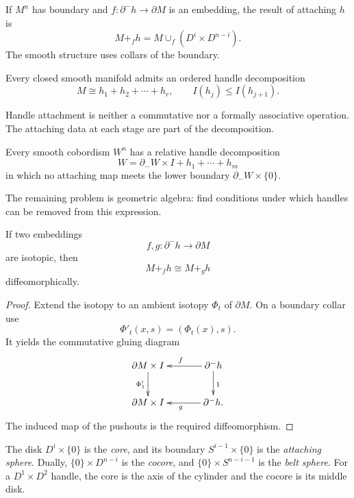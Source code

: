 If $M^n$ has boundary and
$f:\partial^-h\longrightarrow\partial M$ is
an embedding, the result of attaching $h$ is
$$
M+_fh=M\cup_f(D^i\times D^{n-i}).
$$
The smooth structure uses collars of the
boundary.

\begin{theorem}
\label{at-theorem-closed-handle-decomp}
Every closed smooth manifold admits an
ordered handle decomposition
$$
M\cong h_1+h_2+\cdots+h_r,
\qquad I(h_j)\leq I(h_{j+1}).
$$
\end{theorem}

\begin{remark}
\label{at-remark-handle-sum-order}
Handle attachment is neither a commutative
nor a formally associative operation.  The
attaching data at each stage are part of the
decomposition.
\end{remark}

\begin{theorem}
\label{at-theorem-relative-handles}
Every smooth cobordism $W^n$ has a relative
handle decomposition
$$
W=\partial_-W\times I+h_1+\cdots+h_m
$$
in which no attaching map meets the lower
boundary $\partial_-W\times\{0\}$.
\end{theorem}

The remaining problem is geometric algebra:
find conditions under which handles can be
removed from this expression.

\begin{lemma}
\label{at-lemma-isotopic-handle-attachments}
If two embeddings
$$
f,g:\partial^-h\longrightarrow\partial M
$$
are isotopic, then
$$
M+_fh\cong M+_gh
$$
diffeomorphically.
\end{lemma}

\begin{proof}
Extend the isotopy to an ambient isotopy
$\Phi_t$ of $\partial M$.  On a boundary
collar use
$$
\Phi'_t(x,s)=(\Phi_t(x),s).
$$
It yields the commutative gluing diagram
$$
\xymatrix@C=35pt{
\partial M\times I\ar[d]_{\Phi'_1}&
\partial^-h\ar[l]_{f}\ar[d]^{1}\\
\partial M\times I&
\partial^-h\ar[l]^{g}.
}
$$
The induced map of the pushouts is the
required diffeomorphism.
\end{proof}

The disk $D^i\times\{0\}$ is the
\emph{core}, and its boundary
$S^{i-1}\times\{0\}$ is the
\emph{attaching sphere}.  Dually,
$\{0\}\times D^{n-i}$ is the
\emph{cocore}, and
$\{0\}\times S^{n-i-1}$ is the
\emph{belt sphere}.  For a
$D^1\times D^2$ handle, the core is the axis
of the cylinder and the cocore is its middle
disk.

